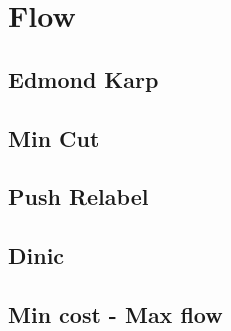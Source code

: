 \newpage
\section{Flow}
\subsection{Edmond Karp}

\subsection{Min Cut}

\subsection{Push Relabel}

\subsection{Dinic}

\subsection{Min cost - Max flow}

